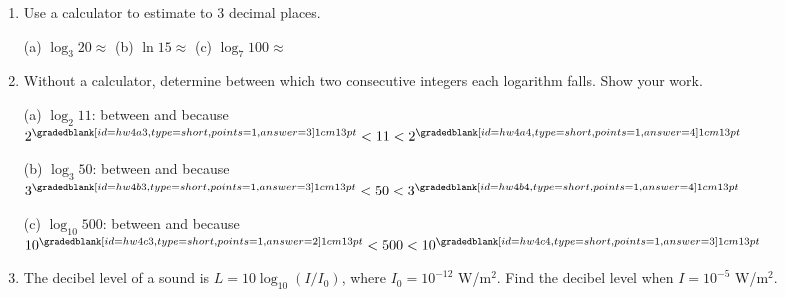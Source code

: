 \documentclass[10pt]{article}
\begin{document}
\begin{enumerate}[itemsep=14pt]
\item Use a calculator to estimate to 3 decimal places.

      \vspace{0.04in}
      (a) $\log_3 20 \approx $ \smash{\gradedblank[id=hw3a, type=short, check=numeric, tolerance=0.0005, points=1, answer={2.727}]{3cm}{13pt}} \qquad
      (b) $\ln 15 \approx $ \smash{\gradedblank[id=hw3b, type=short, check=numeric, tolerance=0.0005, points=1, answer={2.708}]{3cm}{13pt}} \qquad
      (c) $\log_7 100 \approx $ \smash{\gradedblank[id=hw3c, type=short, check=numeric, tolerance=0.0005, points=1, answer={2.367}]{3cm}{13pt}}

\item Without a calculator, determine between which two consecutive integers each logarithm falls.
      Show your work.

      \vspace{0.04in}
      (a) $\log_2 11$: between \smash{\gradedblank[id=hw4a1, type=short, points=1, answer={3}]{1cm}{13pt}} and \smash{\gradedblank[id=hw4a2, type=short, points=1, answer={4}]{1cm}{13pt}}
            \hspace{0.5em} because $2^{\smash{\gradedblank[id=hw4a3, type=short, points=1, answer={3}]{1cm}{13pt}}} < 11 < 2^{\smash{\gradedblank[id=hw4a4, type=short, points=1, answer={4}]{1cm}{13pt}}}$

      \vspace{0.06in}
      (b) $\log_3 50$: between \smash{\gradedblank[id=hw4b1, type=short, points=1, answer={3}]{1cm}{13pt}} and \smash{\gradedblank[id=hw4b2, type=short, points=1, answer={4}]{1cm}{13pt}}
            \hspace{0.5em} because $3^{\smash{\gradedblank[id=hw4b3, type=short, points=1, answer={3}]{1cm}{13pt}}} < 50 < 3^{\smash{\gradedblank[id=hw4b4, type=short, points=1, answer={4}]{1cm}{13pt}}}$

      \vspace{0.06in}
      (c) $\log_{10} 500$: between \smash{\gradedblank[id=hw4c1, type=short, points=1, answer={2}]{1cm}{13pt}} and \smash{\gradedblank[id=hw4c2, type=short, points=1, answer={3}]{1cm}{13pt}}
            \hspace{0.5em} because $10^{\smash{\gradedblank[id=hw4c3, type=short, points=1, answer={2}]{1cm}{13pt}}} < 500 < 10^{\smash{\gradedblank[id=hw4c4, type=short, points=1, answer={3}]{1cm}{13pt}}}$

\item The decibel level of a sound is $L = 10\log_{10}(I / I_0)$, where $I_0 = 10^{-12}$ W/m$^2$.
      Find the decibel level when $I = 10^{-5}$ W/m$^2$.


\end{enumerate}
\end{document}
